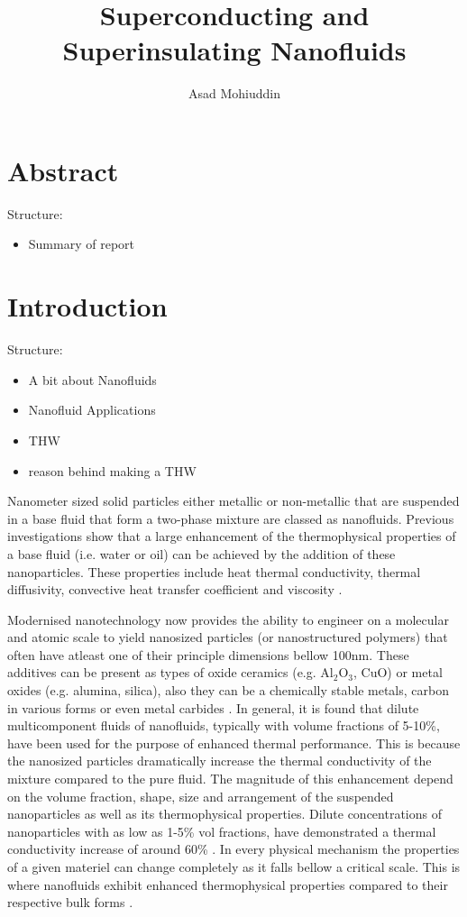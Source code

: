 \documentclass{article}
\author{Asad Mohiuddin}
\title{Superconducting and Superinsulating Nanofluids}
\begin{document}
\clearpage \maketitle
\thispagestyle{empty} %

\newpage \setcounter{page}{1}
\section{Abstract}
	Structure:
	\begin{itemize}
		\item Summary of report
	\end{itemize}

\section{Introduction}
	Structure:
	\begin{itemize}
		\item A bit about Nanofluids
		\item Nanofluid Applications
		\item THW 
		\item reason behind making a THW
	\end{itemize}

Nanometer sized solid particles either metallic or non-metallic that are suspended in a base fluid that form a two-phase mixture are classed as nanofluids. Previous investigations show that a large enhancement of the thermophysical properties of a base fluid (i.e. water or oil) can be achieved by the addition of these nanoparticles. These properties include heat thermal conductivity, thermal diffusivity, convective heat transfer coefficient and viscosity \cite{wong2010applications}. 

Modernised nanotechnology now provides the ability to engineer on a molecular and atomic scale to yield nanosized particles (or nanostructured polymers) that often have atleast one of their principle dimensions bellow 100nm. These additives can be present as types of oxide ceramics (e.g. Al$_{2}$O$_{3}$, CuO) or metal oxides (e.g. alumina, silica), also they can be a chemically stable metals, carbon in various forms or even metal carbides \cite{sheikholeslami2017applications}. In general, it is found that dilute multicomponent fluids of nanofluids, typically with volume fractions of 5-10\%, have been used for the purpose of enhanced thermal performance. This is because the nanosized particles dramatically increase the thermal conductivity of the mixture compared to the pure fluid. The magnitude of this enhancement depend on the volume fraction, shape, size and arrangement of the suspended nanoparticles as well as its thermophysical properties. Dilute concentrations of nanoparticles with as low as 1-5\% vol fractions, have demonstrated a thermal conductivity increase of around 60\% \cite{xuan2000conceptions, kakacc2009review}. In every physical mechanism the properties of a given materiel can change completely as it falls bellow a critical scale. This is where nanofluids exhibit enhanced thermophysical
properties compared to their respective bulk forms \cite{shodhganga2018}.
\end{document}
